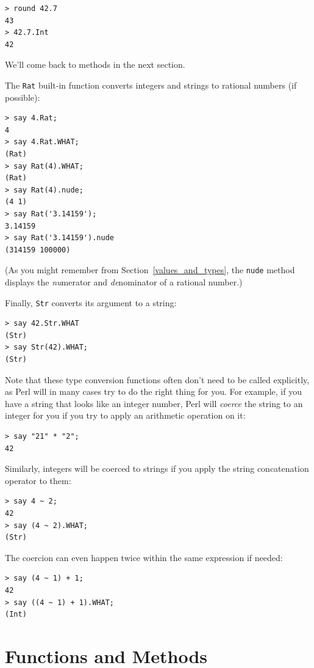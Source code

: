 \begin{verbatim}
> round 42.7
43
> 42.7.Int
42
\end{verbatim}

We'll come back to methods in the next section.

The {\tt Rat} built-in function converts integers and 
strings to rational numbers (if possible):

\begin{verbatim}
> say 4.Rat;
4
> say 4.Rat.WHAT;
(Rat)
> say Rat(4).WHAT;
(Rat)
> say Rat(4).nude;
(4 1)
> say Rat('3.14159');
3.14159
> say Rat('3.14159').nude
(314159 100000)
\end{verbatim}
%
(As you might remember from Section~\ref{values_and_types}, 
the \verb'nude' method displays the \emph{nu}merator and 
\emph{de}nominator of a rational number.)

Finally, {\tt Str} converts its argument to a string:

\begin{verbatim}
> say 42.Str.WHAT
(Str)
> say Str(42).WHAT;
(Str)
\end{verbatim}

Note that these type conversion functions often don't need 
to be called explicitly, as Perl will in many cases try to do the 
right thing for you. For example, if you have a string 
that looks like an integer number, Perl will \emph{coerce} 
the string to an integer for you if you try to apply 
an arithmetic operation on it:

\begin{verbatim}
> say "21" * "2";
42
\end{verbatim}

Similarly, integers will be coerced to strings if you 
apply the string concatenation operator to them:

\begin{verbatim}
> say 4 ~ 2;
42
> say (4 ~ 2).WHAT;
(Str)
\end{verbatim}

The coercion can even happen twice within the same expression 
if needed:

\begin{verbatim}
> say (4 ~ 1) + 1;
42
> say ((4 ~ 1) + 1).WHAT;
(Int)
\end{verbatim}

\section{Functions and Methods}


